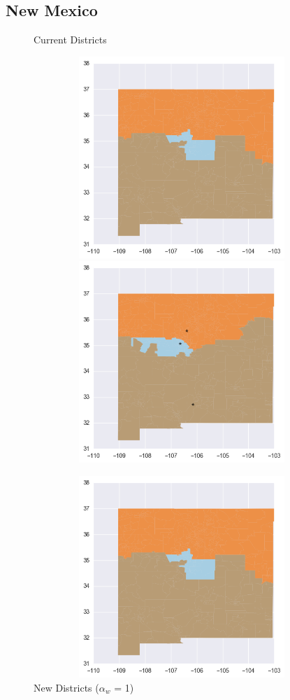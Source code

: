 \clearpage
\newpage

\subsection{New Mexico}
\begin{figure}[htb!] \centering
\caption{ Current Districts }
\includegraphics[width=5in,height=3in,keepaspectratio]{../maps/NM/static/before.png}
\includegraphics[width=5in,height=3in,keepaspectratio]{../maps/NM/static/0_0_after.png}
\caption{ New Districts ($\alpha_w$ = 1) }
\includegraphics[width=5in,height=3in,keepaspectratio]{../maps/NM/static/before.png}

\end{figure}
